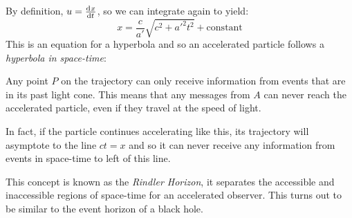 \documentclass[../main.tex]{subfiles}
\begin{document}
By definition, $u = \deriv{x}{t}$, so we can integrate again to yield:
\[
  x = \frac{c}{a'}\sqrt{c^2 + {a'}^2t^2} + \text{constant}
\]
This is an equation for a hyperbola and so an accelerated particle follows a \textit{hyperbola in space-time}:
\begin{center}
\end{center}
Any point $P$ on the trajectory can only receive information from events that are in its past light cone.
This means that any messages from $A$ can never reach the accelerated particle, even if they travel at the speed of light.

In fact, if the particle continues accelerating like this, its trajectory will asymptote to the line $ct = x$ and so it can never receive any information from events in space-time to left of this line.

This concept is known as the \textit{Rindler Horizon}, it separates the accessible and inaccessible regions of space-time for an accelerated observer.
This turns out to be similar to the event horizon of a black hole.
\end{document}
